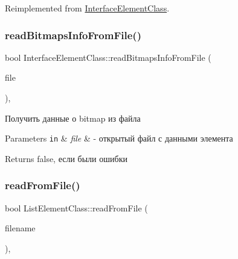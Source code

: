 Reimplemented from \hyperlink{class_interface_element_class_a6dbf6a318a5e4b60b58a7652d2e54b0a}{Interface\+Element\+Class}.

\mbox{\label{class_interface_element_class_a80958e5556a2970645b65a56431c88ca}} 
\subsubsection{\texorpdfstring{read\+Bitmaps\+Info\+From\+File()}{readBitmapsInfoFromFile()}}
{\footnotesize\ttfamily bool Interface\+Element\+Class\+::read\+Bitmaps\+Info\+From\+File (\begin{DoxyParamCaption}\item[{std\+::ifstream $\ast$}]{file }\end{DoxyParamCaption})\hspace{0.3cm}{\ttfamily [protected]}, {\ttfamily [inherited]}}



Получить данные о bitmap из файла 


\begin{DoxyParams}[1]{Parameters}
\mbox{\tt in}  & {\em file} & -\/ открытый файл с данными элемента \\
\hline
\end{DoxyParams}
\begin{DoxyReturn}{Returns}
false, если были ошибки 
\end{DoxyReturn}
\mbox{\label{class_list_element_class_a92e91862b4f1a5280d9465f90a7eefb5}} 
\subsubsection{\texorpdfstring{read\+From\+File()}{readFromFile()}}
{\footnotesize\ttfamily bool List\+Element\+Class\+::read\+From\+File (\begin{DoxyParamCaption}\item[{\hyperlink{class_path_class}{Path\+Class} $\ast$}]{filename }\end{DoxyParamCaption})\hspace{0.3cm}{\ttfamily [protected]}, {\ttfamily [virtual]}}



